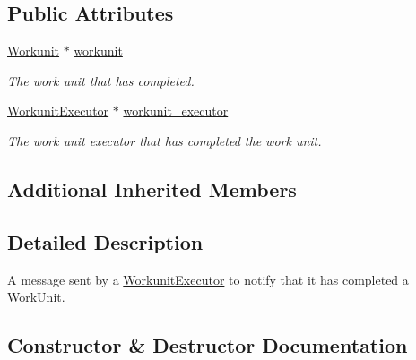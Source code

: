 \subsection*{Public Attributes}
\begin{DoxyCompactItemize}
\item 
\mbox{\label{classwrench_1_1_workunit_executor_done_message_aa008db4525787c0269069558180b6a87}} 
\hyperlink{classwrench_1_1_workunit}{Workunit} $\ast$ \hyperlink{classwrench_1_1_workunit_executor_done_message_aa008db4525787c0269069558180b6a87}{workunit}
\begin{DoxyCompactList}\small\item\em The work unit that has completed. \end{DoxyCompactList}\item 
\mbox{\label{classwrench_1_1_workunit_executor_done_message_a678e7d9f87b7cf1318e28f1895251b2d}} 
\hyperlink{classwrench_1_1_workunit_executor}{Workunit\+Executor} $\ast$ \hyperlink{classwrench_1_1_workunit_executor_done_message_a678e7d9f87b7cf1318e28f1895251b2d}{workunit\+\_\+executor}
\begin{DoxyCompactList}\small\item\em The work unit executor that has completed the work unit. \end{DoxyCompactList}\end{DoxyCompactItemize}
\subsection*{Additional Inherited Members}


\subsection{Detailed Description}
A message sent by a \hyperlink{classwrench_1_1_workunit_executor}{Workunit\+Executor} to notify that it has completed a Work\+Unit. 

\subsection{Constructor \& Destructor Documentation}
\mbox{\label{classwrench_1_1_workunit_executor_done_message_a6b9036befd5f8b778cea00346578b9d8}} 
